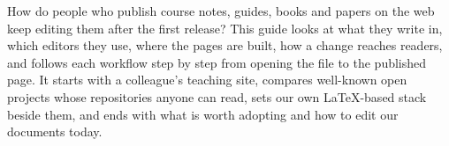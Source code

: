 How do people who publish course notes, guides, books and papers on the web keep editing them after the first release? This guide looks at what they write in, which editors they use, where the pages are built, how a change reaches readers, and follows each workflow step by step from opening the file to the published page. It starts with a colleague's teaching site, compares well-known open projects whose repositories anyone can read, sets our own LaTeX-based stack beside them, and ends with what is worth adopting and how to edit our documents today.
